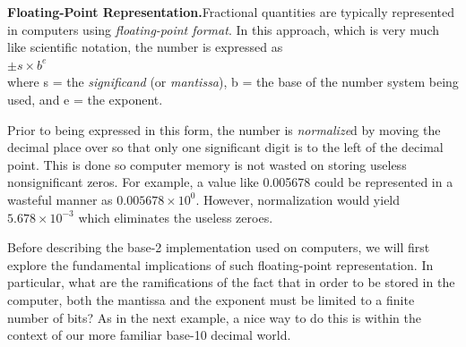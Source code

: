 \documentclass[../main.tex]{subfiles}
\begin{document}
\noindent
\textbf{Floating-Point Representation.}\quad Fractional quantities are typically represented in computers
using \emph{floating-point format}. In this approach, which is very much like scientific
notation, the number is expressed as\\

$\pm s\times b^e$\\

\noindent
where s = the \emph{significand} (or \emph{mantissa}), b = the base of the number system being used, and
e = the exponent.

Prior to being expressed in this form, the number is \emph{normalize}d by moving the decimal
place over so that only one significant digit is to the left of the decimal point. This is done so
computer memory is not wasted on storing useless nonsignificant zeros. For example, a value
like 0.005678 could be represented in a wasteful manner as $0.005678 \times 10^0$. However, normalization
would yield $5.678 \times 10^{-3}$ which eliminates the useless zeroes.

Before describing the base-2 implementation used on computers, we will first explore
the fundamental implications of such floating-point representation. In particular,
what are the ramifications of the fact that in order to be stored in the computer, both
the mantissa and the exponent must be limited to a finite number of bits? As in the
next example, a nice way to do this is within the context of our more familiar base-10
decimal world.\\
\end{document}
